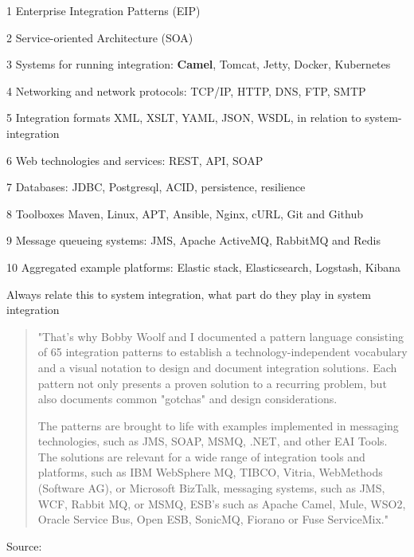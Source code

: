 \documentclass[Screen16to9,17pt]{foils}
\begin{document}
\begin{list2}
\item[1] Enterprise Integration Patterns (EIP)
\item[2] Service-oriented Architecture (SOA)
\item[3] Systems for running integration: {\bf Camel}, Tomcat, Jetty, Docker, Kubernetes
\item[4] Networking and network protocols: TCP/IP, HTTP, DNS, FTP, SMTP
\item[5] Integration formats XML, XSLT, YAML, JSON, WSDL, in relation to system-integration
\item[6] Web technologies and services: REST, API, SOAP
\item[7] Databases: JDBC, Postgresql, ACID, persistence, resilience
\item[8] Toolboxes Maven, Linux, APT, Ansible, Nginx, cURL, Git and Github
\item[9] Message queueing systems: JMS, Apache ActiveMQ, RabbitMQ and Redis
\item[10] Aggregated example platforms: Elastic stack,  Elasticsearch, Logstash, Kibana
\end{list2}

Always relate this to system integration, what part do they play in system integration



\begin{quote}
"That's why Bobby Woolf and I documented a pattern language consisting of 65 integration patterns to establish a technology-independent vocabulary and a visual notation to design and document integration solutions. Each pattern not only presents a proven solution to a recurring problem, but also documents common "gotchas" and design considerations.

The patterns are brought to life with examples implemented in messaging technologies, such as JMS, SOAP, MSMQ, .NET, and other EAI Tools. The solutions are relevant for a wide range of integration tools and platforms, such as IBM WebSphere MQ, TIBCO, Vitria, WebMethods (Software AG), or Microsoft BizTalk, messaging systems, such as JMS, WCF, Rabbit MQ, or MSMQ, ESB's such as Apache Camel, Mule, WSO2, Oracle Service Bus, Open ESB, SonicMQ, Fiorano or Fuse ServiceMix."
\end{quote}

Source:\\
\end{document}

